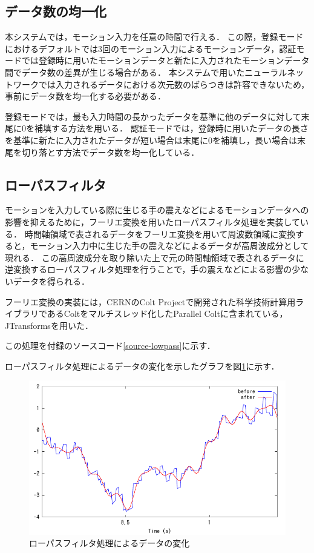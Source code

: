 \subsection{データ数の均一化}
本システムでは，モーション入力を任意の時間で行える．
この際，登録モードにおけるデフォルトでは3回のモーション入力によるモーションデータ，認証モードでは登録時に用いたモーションデータと新たに入力されたモーションデータ間でデータ数の差異が生じる場合がある．
本システムで用いたニューラルネットワークでは入力されるデータにおける次元数のばらつきは許容できないため，事前にデータ数を均一化する必要がある．

登録モードでは，最も入力時間の長かったデータを基準に他のデータに対して末尾に0を補填する方法を用いる．
認証モードでは，登録時に用いたデータの長さを基準に新たに入力されたデータが短い場合は末尾に0を補填し，長い場合は末尾を切り落とす方法でデータ数を均一化している．

\subsection{ローパスフィルタ}
モーションを入力している際に生じる手の震えなどによるモーションデータへの影響を抑えるために，フーリエ変換を用いたローパスフィルタ処理を実装している．
時間軸領域で表されるデータをフーリエ変換を用いて周波数領域に変換すると，モーション入力中に生じた手の震えなどによるデータが高周波成分として現れる．
この高周波成分を取り除いた上で元の時間軸領域で表されるデータに逆変換するローパスフィルタ処理を行うことで，手の震えなどによる影響の少ないデータを得られる．

フーリエ変換の実装には，CERNのColt Project\cite{4-colt-project}で開発された科学技術計算用ライブラリであるColtをマルチスレッド化したParallel Colt\cite{4-parallel-colt}に含まれている，JTransforms\cite{4-jtransforms}を用いた．

この処理を付録のソースコード\ref{source-lowpass}に示す．

ローパスフィルタ処理によるデータの変化を示したグラフを図\ref{graph-lowpass}に示す．

\begin{figure}[bthp]
  \centering
  \includegraphics[bb=0 0 360 216, width=12cm]{Graphs/lowpass.pdf}
  \caption{ローパスフィルタ処理によるデータの変化}
  \label{graph-lowpass}
\end{figure}

